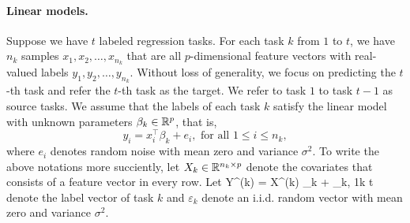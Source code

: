 \paragraph{Linear models.}
Suppose we have $t$ labeled regression tasks. %
For each task $k$ from $1$ to $t$, we have $n_k$ samples $x_1, x_2, \dots, x_{n_k}$ that are all $p$-dimensional feature vectors with real-valued labels $y_1, y_2, \dots, y_{n_k}$.
Without loss of generality, we focus on predicting the $t$-th task and refer the $t$-th task as the target.
We refer to task $1$ to task $t-1$ as source tasks.
We assume that the labels of each task $k$ satisfy the linear model with unknown parameters $\beta_k\in\mathbb{R}^p$, that is,
	\[ y_i = x_i^{\top}\beta_k + e_i, \text{ for all } 1 \le i \le n_k, \]
where $e_i$ denotes random noise with mean zero and variance $\sigma^2$.
To write the above notations more succiently, let $X_k \in \mathbb{R}^{n_k \times p}$ denote the covariates that consists of a feature vector in every row.
Let
	\be\label{model_YvsX} Y^{(k)} = X^{(k)} \beta_k + \varepsilon_k,  1\le k \le t \ee denote the label vector of task $k$ and $\varepsilon_k$ denote an i.i.d. random vector with mean zero and variance $\sigma^2$.

